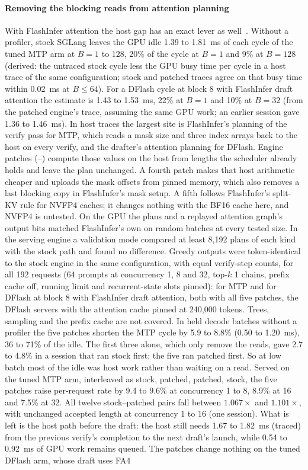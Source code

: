 \paragraph{Removing the blocking reads from attention planning} With FlashInfer attention the host gap has an exact lever as well~. Without a profiler, stock SGLang leaves the GPU idle 1.39 to 1.81~ms of each cycle of the tuned MTP arm at $B=1$ to 128, 20\% of the cycle at $B=1$ and 9\% at $B=128$ (derived: the untraced stock cycle less the GPU busy time per cycle in a host trace of the same configuration; stock and patched traces agree on that busy time within 0.02~ms at $B\le 64$). For a DFlash cycle at block 8 with FlashInfer draft attention the estimate is 1.43 to 1.53~ms, 22\% at $B=1$ and 10\% at $B=32$ (from the patched engine's trace, assuming the same GPU work; an earlier session gave 1.36 to 1.46~ms). In host traces the largest site is FlashInfer's planning of the verify pass for MTP, which reads a mask size and three index arrays back to the host on every verify, and the drafter's attention planning for DFlash. Engine patches (--) compute those values on the host from lengths the scheduler already holds and leave the plan unchanged. A fourth patch makes that host arithmetic cheaper and uploads the mask offsets from pinned memory, which also removes a last blocking copy in FlashInfer's mask setup. A fifth follows FlashInfer's split-KV rule for NVFP4 caches; it changes nothing with the BF16 cache here, and NVFP4 is untested. On the GPU the plans and a replayed attention graph's output bits matched FlashInfer's own on random batches at every tested size. In the serving engine a validation mode compared at least 8,192 plans of each kind with the stock path and found no difference. Greedy outputs were token-identical to the stock engine in the same configuration, with equal verify-step counts, for all 192 requests (64 prompts at concurrency 1, 8 and 32, top-$k$ 1 chains, prefix cache off, running limit and recurrent-state slots pinned): for MTP and for DFlash at block 8 with FlashInfer draft attention, both with all five patches, the DFlash servers with the attention cache pinned at 240,000 tokens. Trees, sampling and the prefix cache are not covered. In held decode batches without a profiler the five patches shorten the MTP cycle by 5.9 to 8.8\% (0.50 to 1.20~ms), 36 to 71\% of the idle. The first three alone, which only remove the reads, gave 2.7 to 4.8\% in a session that ran stock first; the five ran patched first. So at low batch most of the idle was host work rather than waiting on a read. Served on the tuned MTP arm, interleaved as stock, patched, patched, stock, the five patches raise per-request rate by 9.4 to 9.6\% at concurrency 1 to 8, 8.9\% at 16 and 7.5\% at 32. All twelve stock--patched pairs fall between $1.067\times$ and $1.101\times$, with unchanged accepted length at concurrency 1 to 16 (one session). What is left is the host path before the draft: the host still needs 1.67 to 1.82~ms (traced) from the previous verify's completion to the next draft's launch, while 0.54 to 0.92~ms of GPU work remains queued. The patches change nothing on the tuned DFlash arm, whose draft uses FA4 